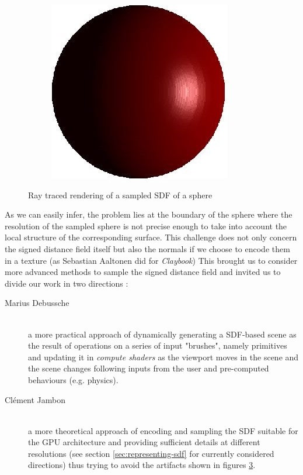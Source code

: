 \documentclass[10pt,a4paper,english, twocolumn]{article}
\begin{document}
\begin{figure}
\begin{subfigure}{.3\linewidth}
        \caption{}
        \label{sfig:sampled-sphere2}
    \end{subfigure}
    \begin{subfigure}{.3\linewidth}
        \centering
        \includegraphics[width=.9\linewidth]{figures/discretized_sdf_512.JPG}
        \caption{}
        \label{sfig:sampled-sphere3}
    \end{subfigure}
    \caption{Ray traced rendering of a sampled SDF of a sphere}
    \label{fig:sampled-sphere}
\end{figure}

As we can easily infer, the problem lies at the boundary of the sphere where the resolution of the sampled sphere is not precise enough to take into account the local structure of the corresponding surface. This challenge does not only concern the signed distance field itself but also the normals if we choose to encode them in a texture (as Sebastian Aaltonen did for \textit{Claybook}) This brought us to consider more advanced methods to sample the signed distance field and invited us to divide our work in two directions :
\begin{description}
    \item[Marius Debussche] $ $ \\
    a more practical approach of dynamically generating a SDF-based scene as the result of operations on a series of input "brushes", namely primitives and updating it in \textit{compute shaders} as the viewport moves in the scene and the scene changes following inputs from the user and pre-computed behaviours (e.g. physics).
    \item[Clément Jambon] $ $ \\
    a more theoretical approach of encoding and sampling the SDF suitable for the GPU architecture and providing sufficient details at different resolutions (see section \ref{sec:representing-sdf} for currently considered directions) thus trying to avoid the artifacts shown in figures \ref{fig:sampled-sphere}.
\end{description}
\end{document}
